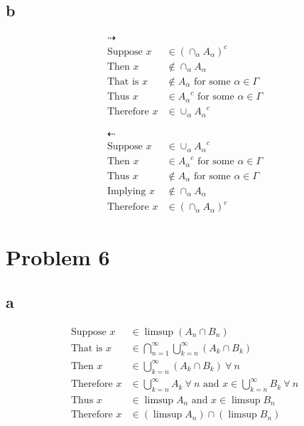 \documentclass{article}
\begin{document}
\begin{flushleft}
\subsection*{b}
\begin{align*}
\dashrightarrow\\
\text{Suppose } x &\in (\cap_\alpha A_\alpha)^c\\
\text{Then } x &\notin \cap_\alpha A_\alpha\\
\text{That is } x &\notin A_\alpha \text{ for some } \alpha \in \Gamma\\
\text{Thus } x &\in {A_\alpha}^c \text{ for some } \alpha \in \Gamma\\
\text{Therefore } x &\in \cup_\alpha {A_\alpha}^c
\end{align*}

\begin{align*}
\dashleftarrow\\
\text{Suppose } x &\in \cup_\alpha {A_\alpha}^c\\
\text{Then } x &\in {A_\alpha}^c \text{ for some } \alpha \in \Gamma\\
\text{Thus } x&\notin A_\alpha \text{ for some } \alpha \in \Gamma\\
\text{Implying } x &\notin \cap_\alpha A_\alpha\\
\text{Therefore } x&\in (\cap_\alpha A_\alpha)^c
\end{align*}

\pagebreak
{}
\section*{Problem 6}
\subsection*{a}
\begin{align*}
\text{Suppose } x &\in \limsup (A_n \cap B_n)\\
\text{That is } x &\in \bigcap \limits_{n=1}^{\infty} \bigcup \limits_{k=n}^{\infty} (A_k \cap B_k)\\
\text{Then } x &\in \bigcup \limits_{k=n}^{\infty} (A_k \cap B_k) \ \forall \ n\\
\text{Therefore } x &\in \bigcup \limits_{k=n}^{\infty} A_k \ \forall \ n
\text{ and } x \in \bigcup \limits_{k=n}^{\infty} B_k \ \forall \ n\\
\text{Thus } x &\in \limsup A_n \text{ and } x \in \limsup B_n\\
\text{Therefore } x &\in (\limsup A_n) \cap (\limsup B_n)
\end{align*}


\end{flushleft}
\end{document}
